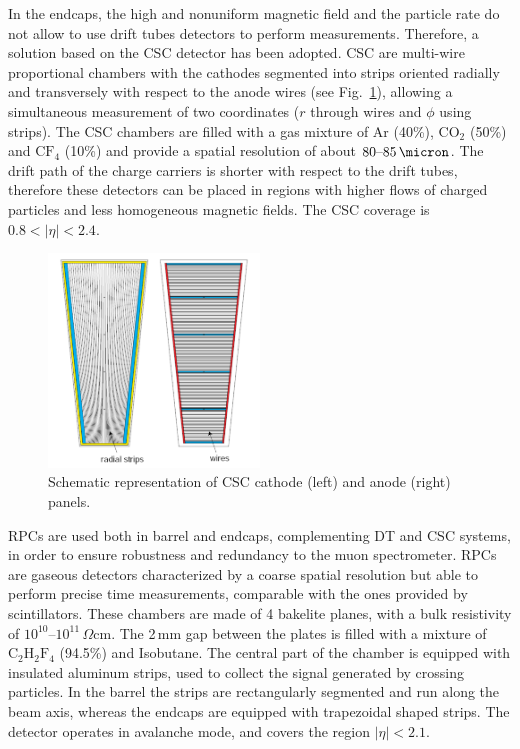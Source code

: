 In the endcaps, the high and nonuniform magnetic field and the particle rate do not allow to use drift tubes detectors to perform measurements. Therefore, a solution based on the CSC detector has been adopted. CSC are multi-wire proportional chambers with the cathodes segmented into strips oriented radially and transversely with respect to the anode wires (see Fig.~\ref{fig:csc}), allowing a simultaneous measurement of two coordinates ($r$ through wires and $\phi$ using strips). The CSC chambers are filled with a gas mixture of Ar (40\%), $\mathrm{CO_2}$ (50\%) and $\mathrm{CF_4}$ (10\%) and provide a spatial resolution of about $80\mbox{--}85\,\micron$.
The drift path of the charge carriers is shorter with respect to the drift tubes, therefore these detectors can be placed in regions with higher flows of charged particles and less homogeneous magnetic fields. The CSC coverage is $0.8 < |\eta| < 2.4$.
\begin{figure}[htb]
\centering
\includegraphics[width=0.5\textwidth]{images/csc.png}
\caption{Schematic representation of CSC cathode (left) and anode (right) panels.}\label{fig:csc}
\end{figure}

RPCs are used both in barrel and endcaps, complementing DT and CSC systems, in order to ensure robustness and redundancy to the muon spectrometer.
RPCs are gaseous detectors characterized by a coarse spatial resolution but able to perform precise time measurements, comparable with the ones provided by scintillators. These chambers are made of 4 bakelite planes, with a bulk resistivity of $10^{10}\mbox{--}10^{11}\,\Omega$cm. The 2\,mm gap between the plates is filled with a mixture of $\mathrm{C_2 H_2 F_4}$ (94.5\%) and Isobutane. 
The central part of the chamber is equipped with insulated aluminum strips, used to collect the signal generated by crossing particles. In the barrel the strips are rectangularly segmented and run along the beam axis, whereas the endcaps are equipped with trapezoidal shaped strips. The detector operates in avalanche mode, and covers the region $|\eta|<2.1$.

